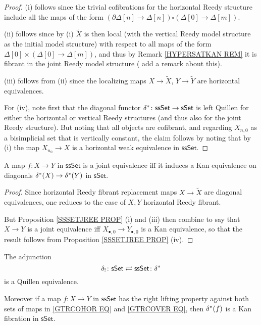 \documentclass[a4paper,10pt,draft]{article}%
\begin{document}
\begin{proof}
(i) follows since the trivial cofibrations for the horizontal Reedy structure include all the maps of the form
$(\partial \Delta[n] \to \Delta[n]) \square (\Delta[0] \to \Delta[m])$.

(ii) follows since by (i) $\tilde{X}$ is then local
(with the vertical Reedy model structure as the initial model structure)
with respect to all maps of the form
$\Delta[0] \times (\Delta[0] \to \Delta[m])$,
and thus by Remark \ref{HYPERSATKAN REM}
it is fibrant in the joint Reedy model structure ({\color{blue} add a remark about this}).

(iii) follows from (ii) since the localizing maps 
$X \to \tilde{X}$, $Y \to \tilde{Y}$
are horizontal equivalences.

For (iv), note first that the diagonal functor
$\delta^{\**} \colon \mathsf{ssSet} \to \mathsf{sSet}$
is left Quillen for either the horizontal or vertical Reedy structures (and thus also for the joint Reedy structure). But noting that all objects are cofibrant, and regarding 
$X_{n,0}$ as a bisimplicial set that is vertically constant, the claim
follows by noting that by (i) the map
$X_{n_0} \to X$ is a horizontal weak equivalence in $\mathsf{ssSet}$.
\end{proof}

\begin{corollary}\label{WEAKDIAG COR}
	A map $f\colon X \to Y$ in $\mathsf{ssSet}$ is a joint equivalence iff it induces a Kan equivalence on diagonals
	$\delta^{\**}(X) \to \delta^{\**}(Y)$ in $\mathsf{sSet}$.
\end{corollary}

\begin{proof}
	Since horizontal Reedy fibrant replacement maps
	$X \to \tilde{X}$ are diagonal equivalences, 
	one reduces to the case of $X,Y$ horizontal Reedy fibrant.
	
	But Proposition \ref{SSSETJREE PROP} (i) and (iii) then combine to say that $X \to Y$ is a joint equivalence iff
	$X_{\bullet,0} \to Y_{\bullet,0}$ is a Kan equivalence, 
	so that the result follows from Proposition \ref{SSSETJREE PROP} (iv).
\end{proof}

\begin{corollary}\label{SSETSSETADJ COR}
	The adjunction
\[
	\delta_{!}\colon \mathsf{sSet} 
		\rightleftarrows 
	\mathsf{ssSet} \colon \delta^{\**}
\]
is a Quillen equivalence.

Moreover if a map $f\colon X \to Y$ in $\mathsf{ssSet}$ has the right lifting property
against both sets of maps in
\eqref{GTRCOHOR EQ} and \eqref{GTRCOVER EQ}, then
$\delta^{\**} (f)$ is a Kan fibration in $\mathsf{sSet}$.
\end{corollary}
\end{document}
